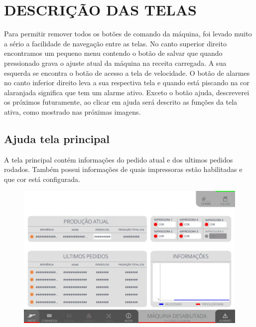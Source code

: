 \thispagestyle{fancy}

\vspace*{40 pt}

\section{\large{\MakeUppercase{Descrição das telas}}} \label{sec:telaPrincipal}

Para permitir remover todos os botões de comando da máquina, foi levado muito a sério a facilidade de navegação entre as telas.
No canto superior direito encontramos um pequeno menu contendo o botão de salvar que quando pressionado grava o ajuste atual da
máquina na receita carregada. A sua esquerda se encontra o botão de acesso a tela de velocidade.
O botão de alarmes no canto inferior direito leva a sua respectiva tela e quando está piscando na cor alaranjada significa
que tem um alarme ativo. Exceto o botão ajuda, descreverei os próximos futuramente, ao clicar em ajuda será descrito as
funções da tela ativa, como mostrado nas próximas imagens.
\subsection{Ajuda tela principal} \label{sec:telaPrincipalAjudaTelaPrincipal}
A tela principal contém informações do pedido atual e dos ultimos pedidos rodados. Também
possui informações de quais impressoras estão habilitadas e que cor está configurada.
\vspace*{\fill}
\begin{figure}[h]
    \centering
    \includegraphics[width=480 px,height=300 px]{src/imagesICV/01-main/1.png}
\end{figure}
\vspace*{\fill}

